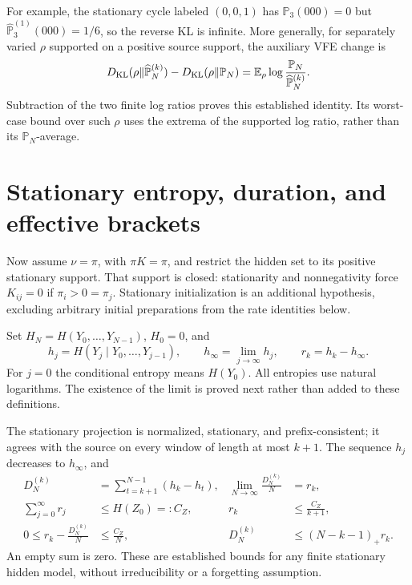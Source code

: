 For example, the stationary cycle labeled \((0,0,1)\) has
\(\mathbb P_3(000)=0\) but
\(\widehat{\mathbb P}_3^{(1)}(000)=1/6\), so the reverse KL is infinite.
More generally, for separately varied \(\rho\) supported on a positive
source support, the auxiliary VFE change is
\begin{equation}
 D_{\mathrm{KL}}(\rho\Vert\widehat{\mathbb P}_N^{(k)})
   -D_{\mathrm{KL}}(\rho\Vert\mathbb P_N)
 =\mathbb E_\rho\log\frac{\mathbb P_N}{\widehat{\mathbb P}_N^{(k)}}.
\label{eq:rg-memory-recognition-vfe-difference}
\end{equation}
Subtraction of the two finite log ratios proves this established identity.
Its worst-case bound over such \(\rho\) uses the extrema of the supported
log ratio, rather than its \(\mathbb P_N\)-average.

\section{Stationary entropy, duration, and effective brackets}
\label{sec:rg-memory-stationary}

Now assume \(\nu=\pi\), with \(\pi K=\pi\), and restrict the hidden
set to its positive stationary support. That support is closed: stationarity
and nonnegativity force \(K_{ij}=0\) if \(\pi_i>0=\pi_j\).
Stationary initialization is an additional hypothesis, excluding arbitrary
initial preparations from the rate identities below. 

Set \(H_N=H(Y_0,\ldots,Y_{N-1})\), \(H_0=0\), and
\begin{equation}
 h_j=H(Y_j\mid Y_0,\ldots,Y_{j-1}),\qquad
 h_\infty=\lim_{j\to\infty}h_j,\qquad r_k=h_k-h_\infty.
\label{eq:rg-memory-entropy-notation}
\end{equation}
For \(j=0\) the conditional entropy means \(H(Y_0)\). All entropies
use natural logarithms. The existence of the limit is proved next rather
than added to these definitions. 

The stationary projection is normalized, stationary, and prefix-consistent;
it agrees with the source on every window of length at most \(k+1\).
The sequence \(h_j\) decreases to \(h_\infty\), and
\begin{equation}
\begin{aligned}
 D_N^{(k)}&=\sum_{t=k+1}^{N-1}(h_k-h_t),
 &\lim_{N\to\infty}\frac{D_N^{(k)}}N&=r_k,\\
 \sum_{j=0}^\infty r_j&\leq H(Z_0)=:C_Z,
 &r_k&\leq\frac{C_Z}{k+1},\\
 0\leq r_k-\frac{D_N^{(k)}}N&\leq\frac{C_Z}{N},
 &D_N^{(k)}&\leq(N-k-1)_+r_k.
\end{aligned}
\label{eq:rg-memory-duration-identities}
\end{equation}
An empty sum is zero. These are established bounds for any finite stationary
hidden model, without irreducibility or a forgetting assumption.

